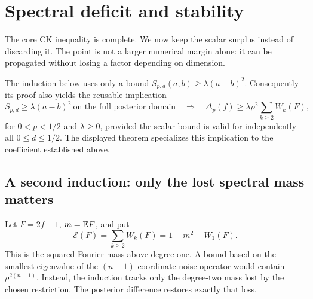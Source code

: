 \section{Spectral deficit and stability}\label{app:linear}
The core CK inequality is complete. We now keep the scalar surplus instead of discarding it. The point is not a larger numerical margin alone: it can be propagated without losing a factor depending on dimension.

The induction below uses only a bound $S_{p,d}(a,b)\ge\lambda(a-b)^2$. Consequently its proof also yields the reusable implication
\begin{equation}\label{eq:generic-spectral}
 S_{p,d}\ge\lambda(a-b)^2\ \text{on the full posterior domain}
 \quad\Longrightarrow\quad
 \Delta_p(f)\ge\lambda\rho^2\sum_{k\ge2}W_k(F),
\end{equation}
for $0<p<1/2$ and $\lambda\ge0$, provided the scalar bound is valid for independently all $0\le d\le1/2$. The displayed theorem specializes this implication to the coefficient established above.

\subsection{A second induction: only the lost spectral mass matters}
Let $F=2f-1$, $m=\mathbb E F$, and put
\[
\mathcal E(F)=\sum_{k\ge2}W_k(F)=1-m^2-W_1(F).
\]
This is the squared Fourier mass above degree one. A bound based on the smallest eigenvalue of the $(n-1)$-coordinate noise operator would contain $\rho^{2(n-1)}$. Instead, the induction tracks only the degree-two mass lost by the chosen restriction. The posterior difference restores exactly that loss.

